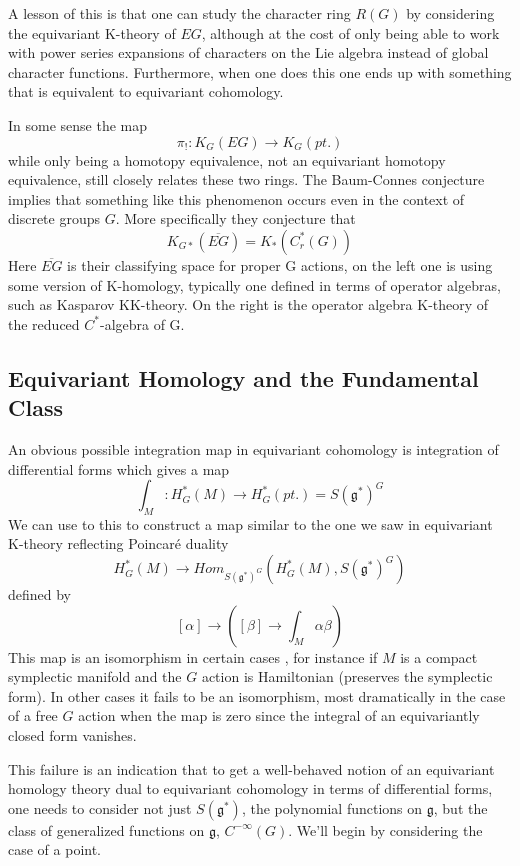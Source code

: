\documentclass[a4paper,a4paper]{article}
\theoremstyle{conjecture}
\begin{document}
A lesson of this is that one can study the character ring
$R(G)$ by considering the
equivariant K-theory of $EG$, although at the cost of
only being able to work with power series expansions of characters on the
Lie algebra instead of global character functions. Furthermore, when one
does this one ends up with something that is equivalent to equivariant cohomology.
 
In some sense the map
$$\pi_!:K_G(EG)\rightarrow K_G(pt.)$$
while only being a homotopy equivalence, not an equivariant homotopy
equivalence, still closely relates these two rings.  
The Baum-Connes conjecture implies that something like this phenomenon occurs even in the
context of discrete groups $G$. More specifically they conjecture \cite{BCH} that
$$K_{G*}(\overline{EG})=K_*(C_r^*(G))$$
Here $\overline{EG}$ is their classifying space for proper G
actions, on the left one is using some version of K-homology,
typically one defined in terms of operator algebras, such as
Kasparov KK-theory. On the right is the operator algebra K-theory
of the reduced $C^*$-algebra of G.


\subsection {Equivariant Homology and the Fundamental Class}

An obvious possible integration map in equivariant cohomology is
integration of differential forms which gives a map
$$\int_M:H^*_G(M)\rightarrow H^*_G(pt.)=S(\mathfrak g^*)^G$$
We can use to this to construct a map similar to the one we saw in equivariant K-theory reflecting
Poincar\'e duality
$$H^*_G(M)\rightarrow Hom _{S(\mathfrak g^*)^G}(H^*_G(M),S(\mathfrak g^*)^G)$$
defined by
$$[\alpha]\rightarrow ([\beta]\rightarrow \int_M \alpha\beta)$$
This map is an isomorphism in certain cases \cite{Ginzburg}, for instance
if $M$ is a compact symplectic manifold and the $G$ action is Hamiltonian (preserves
the symplectic form).  In other cases it fails to be an isomorphism, most dramatically
in the case of a free $G$ action when the map is zero since the integral of an equivariantly
closed form vanishes.  

This failure is an indication that to get a well-behaved notion of an
equivariant homology theory dual to equivariant cohomology in terms of differential
forms, one needs to consider not just $S(\mathfrak g^*)$, the polynomial functions on $\mathfrak g$, but the
class of generalized functions on $\mathfrak g$, $C^{-\infty}(G)$.  We'll begin by considering the
case of a point.
\end{document}
